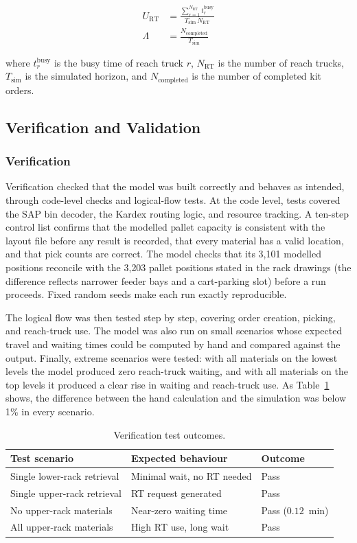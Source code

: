 \documentclass[12pt,a4paper]{article}
\begin{document}
\begin{align}
U_{\mathrm{RT}} &= \frac{\sum_{r=1}^{N_{\mathrm{RT}}} t^{\mathrm{busy}}_r}
{T_{\mathrm{sim}}\, N_{\mathrm{RT}}} \label{eq:util}\\[2pt]
\Lambda &= \frac{N_{\mathrm{completed}}}{T_{\mathrm{sim}}} \label{eq:thru}
\end{align}

\noindent where $t^{\mathrm{busy}}_r$ is the busy time of reach truck $r$,
$N_{\mathrm{RT}}$ is the number of reach trucks, $T_{\mathrm{sim}}$ is the
simulated horizon, and $N_{\mathrm{completed}}$ is the number of completed kit
orders.

\subsection{Verification and Validation}
\subsubsection{Verification}
Verification checked that the model was built correctly and behaves as
intended, through code-level checks and logical-flow tests. At the code level,
tests covered the SAP bin decoder, the Kardex routing logic, and resource
tracking. A ten-step control list confirms that the modelled pallet capacity
is consistent with the layout file before any result is recorded, that every
material has a valid location, and that pick counts are correct. The model
checks that its 3{,}101 modelled positions reconcile with the 3{,}203 pallet
positions stated in the rack drawings (the difference reflects narrower feeder
bays and a cart-parking slot) before a run proceeds. Fixed random seeds make
each run exactly reproducible.

The logical flow was then tested step by step, covering order creation,
picking, and reach-truck use. The model was also run on small scenarios whose
expected travel and waiting times could be computed by hand and compared
against the output. Finally, extreme scenarios were tested: with all materials
on the lowest levels the model produced zero reach-truck waiting, and with all
materials on the top levels it produced a clear rise in waiting and reach-truck
use. As Table~\ref{tab:verify} shows, the difference between the hand
calculation and the simulation was below 1\% in every scenario.

\begin{table}[htbp]
\centering
\caption{Verification test outcomes.}
\label{tab:verify}
\begin{tabular}{lll}
\toprule
Test scenario & Expected behaviour & Outcome \\
\midrule
Single lower-rack retrieval & Minimal wait, no RT needed & Pass \\
Single upper-rack retrieval & RT request generated & Pass \\
No upper-rack materials & Near-zero waiting time & Pass ($0.12$~min) \\
All upper-rack materials & High RT use, long wait & Pass \\
\bottomrule
\end{tabular}
\end{table}
\end{document}
